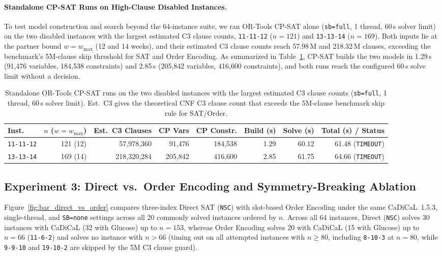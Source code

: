 \documentclass[a4paper,fleqn]{cas-sc}
\begin{document}
\paragraph{Standalone CP-SAT Runs on High-Clause Disabled Instances.}
To test model construction and search beyond the 64-instance suite, we ran OR-Tools CP-SAT alone (\texttt{sb=full}, 1 thread, 60\,s solver limit) on the two disabled instances with the largest estimated C3 clause counts, \texttt{11-11-12} ($n=121$) and \texttt{13-13-14} ($n=169$). Both inputs lie at the partner bound $w = w_{\max}$ (12 and 14 weeks), and their estimated C3 clause counts reach 57.98\,M and 218.32\,M clauses, exceeding the benchmark's 5M-clause skip threshold for SAT and Order Encoding. As summarized in Table~\ref{tab:giant_cp}, CP-SAT builds the two models in 1.29\,s (91{,}476 variables, 184{,}538 constraints) and 2.85\,s (205{,}842 variables, 416{,}600 constraints), and both runs reach the configured 60\,s solve limit without a decision.

\begin{table}[pos=!htb]
\centering\small
\setlength{\tabcolsep}{4pt}
\caption{Standalone OR-Tools CP-SAT runs on the two disabled instances with the largest estimated C3 clause counts (\texttt{sb=full}, 1 thread, 60\,s solver limit). Est.\ C3 gives the theoretical CNF C3 clause count that exceeds the 5M-clause benchmark skip rule for SAT/Order.}
\label{tab:giant_cp}
\begin{tabular}{lrrrrrrr}
\toprule
\textbf{Inst.} & $n$ ($w = w_{\max}$) & \textbf{Est.\ C3 Clauses} & \textbf{CP Vars} & \textbf{CP Constr.} & \textbf{Build (s)} & \textbf{Solve (s)} & \textbf{Total (s) / Status} \\
\midrule
\texttt{11-11-12} & 121 (12) & 57{,}978{,}360 & 91{,}476 & 184{,}538 & 1.29 & 60.12 & 61.48 (\texttt{TIMEOUT}) \\
\texttt{13-13-14} & 169 (14) & 218{,}320{,}284 & 205{,}842 & 416{,}600 & 2.85 & 61.75 & 64.66 (\texttt{TIMEOUT}) \\
\bottomrule
\end{tabular}
\end{table}

\subsection{Experiment 3: Direct vs.\ Order Encoding and Symmetry-Breaking Ablation}
\label{sec:exp3_order_sb}

Figure~\ref{fig:bar_direct_vs_order} compares three-index Direct SAT (\texttt{NSC}) with slot-based Order Encoding under the same CaDiCaL~1.5.3, single-thread, and \texttt{SB=none} settings across all 20 commonly solved instances ordered by $n$. Across all 64 instances, Direct (\texttt{NSC}) solves 30 instances with CaDiCaL (32 with Glucose) up to $n=153$, whereas Order Encoding solves 20 with CaDiCaL (15 with Glucose) up to $n=66$ (\texttt{11-6-2}) and solves no instance with $n > 66$ (timing out on all attempted instances with $n \ge 80$, including \texttt{8-10-3} at $n=80$, while \texttt{9-9-10} and \texttt{19-10-2} are skipped by the 5M C3 clause guard).
\end{document}
